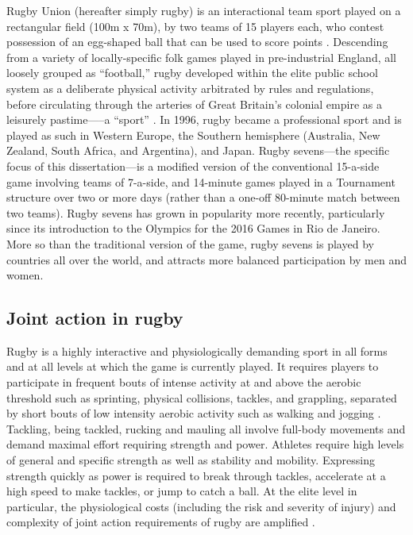 \begin{CJK}{UTF8}{gbsn}
Rugby Union (hereafter simply rugby) is an interactional team sport played on a rectangular field (100m x 70m), by two teams of 15 players each, who contest possession of an egg-shaped ball that can be used to score points \citep{IRB2014}.  Descending from a variety of locally-specific folk games played in pre-industrial England, all loosely grouped as ``football,'' rugby developed within the elite public school system as a deliberate physical activity arbitrated by rules and regulations, before circulating through the arteries of Great Britain's colonial empire as a leisurely pastime—--a ``sport'' \citep{Dunning2005}.  In 1996, rugby became a professional sport and is played as such in Western Europe, the Southern hemisphere (Australia, New Zealand, South Africa, and Argentina), and Japan. Rugby sevens---the specific focus of this dissertation---is a modified version of the conventional 15-a-side game involving teams of 7-a-side, and 14-minute games played in a Tournament structure over two or more days (rather than a one-off 80-minute match between two teams).  Rugby sevens has grown in popularity more recently, particularly since its introduction to the Olympics for the 2016 Games in Rio de Janeiro.  More so than the traditional version of the game, rugby sevens is played by countries all over the world, and attracts more balanced participation by men and women.

\subsection{Joint action in rugby \label{sect:jointActionRugby}}
Rugby is a highly interactive and physiologically demanding sport in all forms and at all levels at which the game is currently played.  It requires players to participate in frequent bouts of intense activity at and above the aerobic threshold such as sprinting, physical collisions, tackles, and grappling, separated by short bouts of low intensity aerobic activity such as walking and jogging \cite{Duthie2003}.  Tackling, being tackled, rucking and mauling all involve full-body movements and demand maximal effort requiring strength and power.  Athletes require high levels of general and specific strength as well as stability and mobility.  Expressing strength quickly as power is required to break through tackles, accelerate at a high speed to make tackles, or jump to catch a ball.  At the elite level in particular, the physiological costs (including the risk and severity of injury) and complexity of joint action requirements of rugby are amplified \citep{Coughlan2011}.


\end{CJK}
